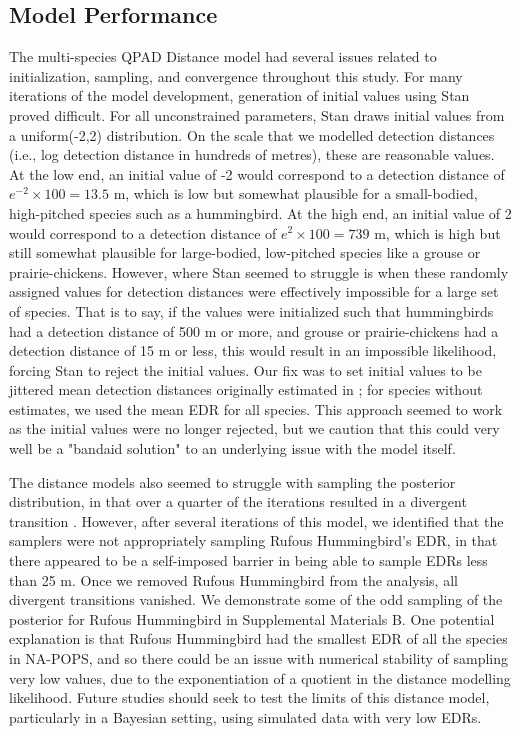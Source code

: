\documentclass[12pt]{article}
\begin{document}
\subsection{Model Performance}

\par The multi-species QPAD Distance model had several issues related to initialization, sampling, and convergence throughout this study.
For many iterations of the model development, generation of initial values using Stan proved difficult.
For all unconstrained parameters, Stan draws initial values from a uniform(-2,2) distribution.
On the scale that we modelled detection distances (i.e., log detection distance in hundreds of metres), these are reasonable values.
At the low end, an initial value of -2 would correspond to a detection distance of $e^{-2} \times 100 = 13.5$ m, which is low but somewhat plausible for a small-bodied, high-pitched species such as a hummingbird.
At the high end, an initial value of 2 would correspond to a detection distance of $e^{2} \times 100 = 739$ m, which is high but still somewhat plausible for large-bodied, low-pitched species like a grouse or prairie-chickens.
However, where Stan seemed to struggle is when these randomly assigned values for detection distances were effectively impossible for a large set of species.
That is to say, if the values were initialized such that hummingbirds had a detection distance of 500 m or more, and grouse or prairie-chickens had a detection distance of 15 m or less, this would result in an impossible likelihood, forcing Stan to reject the initial values.
Our fix was to set initial values to be jittered mean detection distances originally estimated in \citet{edwards_point_2023}; for species without estimates, we used the mean EDR for all species.
This approach seemed to work as the initial values were no longer rejected, but we caution that this could very well be a "bandaid solution" to an underlying issue with the model itself.

\par The distance models also seemed to struggle with sampling the posterior distribution, in that over a quarter of the iterations resulted in a divergent transition \citep{betancourt_diagnosing_2016, leimkuhler_simulating_2005}.
However, after several iterations of this model, we identified that the samplers were not appropriately sampling Rufous Hummingbird's EDR, in that there appeared to be a self-imposed barrier in being able to sample EDRs less than 25 m. 
Once we removed Rufous Hummingbird from the analysis, all divergent transitions vanished.
We demonstrate some of the odd sampling of the posterior for Rufous Hummingbird in Supplemental Materials B.
One potential explanation is that Rufous Hummingbird had the smallest EDR of all the species in NA-POPS, and so there could be an issue with numerical stability of sampling very low values, due to the exponentiation of a quotient in the distance modelling likelihood.
Future studies should seek to test the limits of this distance model, particularly in a Bayesian setting, using simulated data with very low EDRs.
\end{document}
